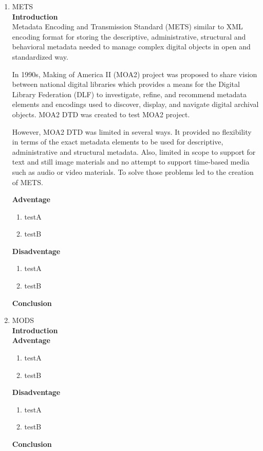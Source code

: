 \documentclass[a4paper]{article}
\begin{document}
\begin{enumerate}
	\item METS\\
	{\bf Introduction}\\
	Metadata Encoding and Transmission Standard (METS) similar to XML encoding format for storing the descriptive, administrative, structural and behavioral metadata needed to manage complex digital objects in open and standardized way.
	
	In 1990s, Making of America II (MOA2) project was proposed to share vision between national digital libraries which provides a means for the Digital Library Federation (DLF) to investigate, refine, and recommend metadata elements and encodings used to discover, display, and navigate digital archival objects. MOA2 DTD was created to test MOA2 project.
	
	However, MOA2 DTD was limited in several ways. It provided no flexibility in terms of the exact metadata elements to be used for descriptive, administrative and structural metadata. Also, limited in scope to support for text and still image materials and no attempt to support time-based media such as audio or video materials. To solve those problems led to the creation of METS.
	
	{\bf Adventage}
	\begin{enumerate}
		\item testA
		\item testB
	\end{enumerate}	
	{\bf Disadventage}
	\begin{enumerate}
		\item testA
		\item testB
	\end{enumerate}
	{\bf Conclusion}\\	
	
	\item MODS\\
	{\bf Introduction}\\
	
	{\bf Adventage}
	\begin{enumerate}
		\item testA
		\item testB
	\end{enumerate}	
	{\bf Disadventage}
	\begin{enumerate}
		\item testA
		\item testB
	\end{enumerate}
	{\bf Conclusion}\\
	

\end{enumerate}
\end{document}
